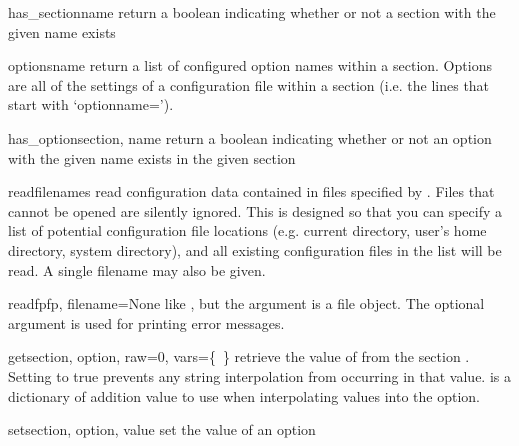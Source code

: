 \documentclass{manual}
\begin{document}
\begin{methoddesc}[ConfigManager]{has\_section}{name}
return a boolean indicating whether or not a section with the given name exists
\end{methoddesc}

\begin{methoddesc}[ConfigManager]{options}{name}
return a list of configured option names within a section.  Options are all
of the settings of a configuration file within a section (i.e. the lines that 
start with `optionname=').
\end{methoddesc}

\begin{methoddesc}[ConfigManager]{has\_option}{section, name}
return a boolean indicating whether or not an option with the given name exists
in the given section
\end{methoddesc}

\begin{methoddesc}[ConfigManager]{read}{filenames}
read configuration data contained in files specified by .
Files that cannot be opened are silently ignored.  This is designed so that
you can specify a list of potential configuration file locations (e.g.
current directory, user's home directory, system directory), and all 
existing configuration files in the list will be read.  A single filename
may also be given.
\end{methoddesc}

\begin{methoddesc}[ConfigManager]{readfp}{fp, filename=None}
like , but the argument is a file object.  The optional
 argument is used for printing error messages.
\end{methoddesc}

\begin{methoddesc}[ConfigManager]{get}{section, option, raw=0, vars=\{~\}}
retrieve the value of  from the section .
Setting  to true prevents any string interpolation from occurring
in that value.   is a dictionary of addition value to use 
when interpolating values into the option.

\end{methoddesc}

\begin{methoddesc}[ConfigManager]{set}{section, option, value}
set the value of an option
\end{methoddesc}
\end{document}
